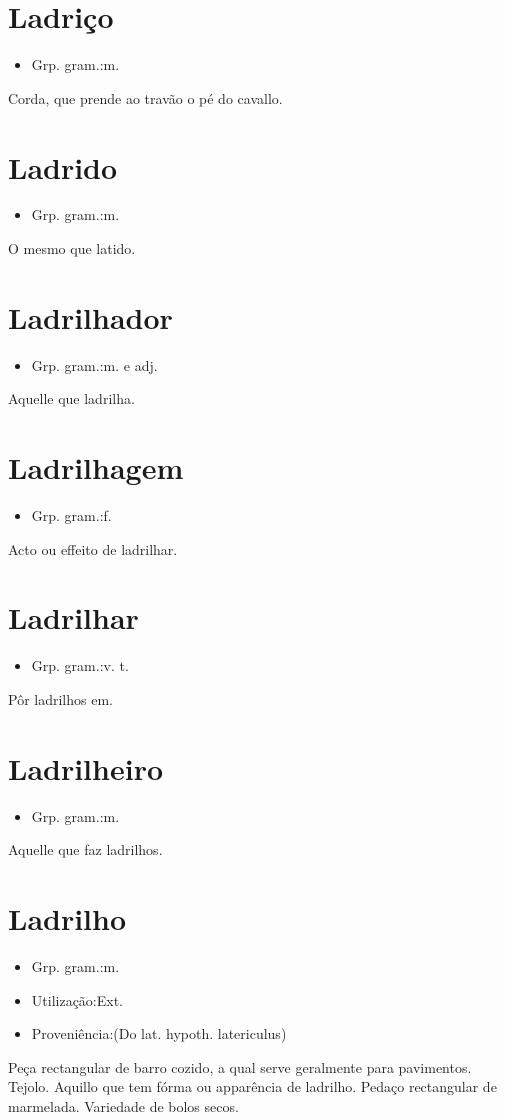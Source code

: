 \section{Ladriço}
\begin{itemize}
\item {Grp. gram.:m.}
\end{itemize}
Corda, que prende ao travão o pé do cavallo.
\section{Ladrido}
\begin{itemize}
\item {Grp. gram.:m.}
\end{itemize}
O mesmo que \textunderscore latido\textunderscore .
\section{Ladrilhador}
\begin{itemize}
\item {Grp. gram.:m.  e  adj.}
\end{itemize}
Aquelle que ladrilha.
\section{Ladrilhagem}
\begin{itemize}
\item {Grp. gram.:f.}
\end{itemize}
Acto ou effeito de ladrilhar.
\section{Ladrilhar}
\begin{itemize}
\item {Grp. gram.:v. t.}
\end{itemize}
Pôr ladrilhos em.
\section{Ladrilheiro}
\begin{itemize}
\item {Grp. gram.:m.}
\end{itemize}
Aquelle que faz ladrilhos.
\section{Ladrilho}
\begin{itemize}
\item {Grp. gram.:m.}
\end{itemize}
\begin{itemize}
\item {Utilização:Ext.}
\end{itemize}
\begin{itemize}
\item {Proveniência:(Do lat. hypoth. \textunderscore latericulus\textunderscore )}
\end{itemize}
Peça rectangular de barro cozido, a qual serve geralmente para pavimentos.
Tejolo.
Aquillo que tem fórma ou apparência de ladrilho.
Pedaço rectangular de marmelada.
Variedade de bolos secos.
